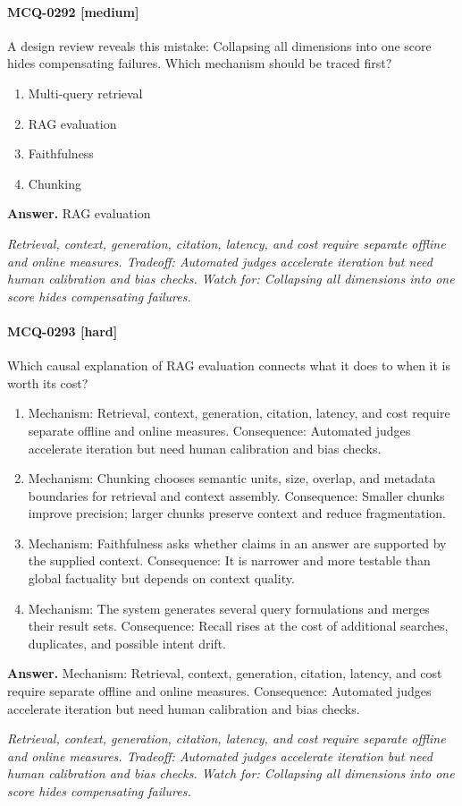 \paragraph{MCQ-0292 [medium]} A design review reveals this mistake: Collapsing all dimensions into one score hides compensating failures. Which mechanism should be traced first?
\begin{enumerate}[label=\Alph*.]
\item Multi-query retrieval
\item RAG evaluation
\item Faithfulness
\item Chunking
\end{enumerate}
\noindent\textbf{Answer.} RAG evaluation
\par\textit{Retrieval, context, generation, citation, latency, and cost require separate offline and online measures. Tradeoff: Automated judges accelerate iteration but need human calibration and bias checks. Watch for: Collapsing all dimensions into one score hides compensating failures.}
\paragraph{MCQ-0293 [hard]} Which causal explanation of RAG evaluation connects what it does to when it is worth its cost?
\begin{enumerate}[label=\Alph*.]
\item Mechanism: Retrieval, context, generation, citation, latency, and cost require separate offline and online measures. Consequence: Automated judges accelerate iteration but need human calibration and bias checks.
\item Mechanism: Chunking chooses semantic units, size, overlap, and metadata boundaries for retrieval and context assembly. Consequence: Smaller chunks improve precision; larger chunks preserve context and reduce fragmentation.
\item Mechanism: Faithfulness asks whether claims in an answer are supported by the supplied context. Consequence: It is narrower and more testable than global factuality but depends on context quality.
\item Mechanism: The system generates several query formulations and merges their result sets. Consequence: Recall rises at the cost of additional searches, duplicates, and possible intent drift.
\end{enumerate}
\noindent\textbf{Answer.} Mechanism: Retrieval, context, generation, citation, latency, and cost require separate offline and online measures. Consequence: Automated judges accelerate iteration but need human calibration and bias checks.
\par\textit{Retrieval, context, generation, citation, latency, and cost require separate offline and online measures. Tradeoff: Automated judges accelerate iteration but need human calibration and bias checks. Watch for: Collapsing all dimensions into one score hides compensating failures.}
